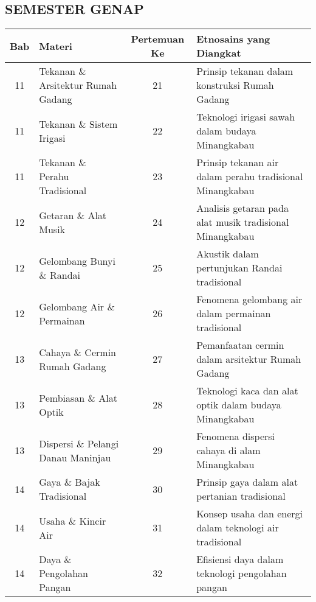 \documentclass[12pt,a4paper]{article}
\begin{document}
\begin{tcolorbox}[colback=white, colframe=black, breakable, title=\textbf{Integrasi Etnosains Minangkabau dalam RPP IPA Kelas VIII}]
\begin{longtable}{|p{1cm}|p{5.5cm}|p{2cm}|p{5.5cm}|}
\end{longtable}

\subsection*{SEMESTER GENAP}
\begin{longtable}{|c|p{4.5cm}|c|p{5.5cm}|}
\hline
\textbf{Bab} & \textbf{Materi} & \textbf{Pertemuan Ke} & \textbf{Etnosains yang Diangkat} \\
\hline

11 & Tekanan \& Arsitektur Rumah Gadang & 21 & Prinsip tekanan dalam konstruksi Rumah Gadang \\
\hline
11 & Tekanan \& Sistem Irigasi & 22 & Teknologi irigasi sawah dalam budaya Minangkabau \\
\hline
11 & Tekanan \& Perahu Tradisional & 23 & Prinsip tekanan air dalam perahu tradisional Minangkabau \\
\hline
12 & Getaran \& Alat Musik & 24 & Analisis getaran pada alat musik tradisional Minangkabau \\
\hline
12 & Gelombang Bunyi \& Randai & 25 & Akustik dalam pertunjukan Randai tradisional \\
\hline
12 & Gelombang Air \& Permainan & 26 & Fenomena gelombang air dalam permainan tradisional \\
\hline
13 & Cahaya \& Cermin Rumah Gadang & 27 & Pemanfaatan cermin dalam arsitektur Rumah Gadang \\
\hline
13 & Pembiasan \& Alat Optik & 28 & Teknologi kaca dan alat optik dalam budaya Minangkabau \\
\hline
13 & Dispersi \& Pelangi Danau Maninjau & 29 & Fenomena dispersi cahaya di alam Minangkabau \\
\hline
14 & Gaya \& Bajak Tradisional & 30 & Prinsip gaya dalam alat pertanian tradisional \\
\hline
14 & Usaha \& Kincir Air & 31 & Konsep usaha dan energi dalam teknologi air tradisional \\
\hline
14 & Daya \& Pengolahan Pangan & 32 & Efisiensi daya dalam teknologi pengolahan pangan \\
\hline

\end{longtable}

\end{tcolorbox}
\end{document}
